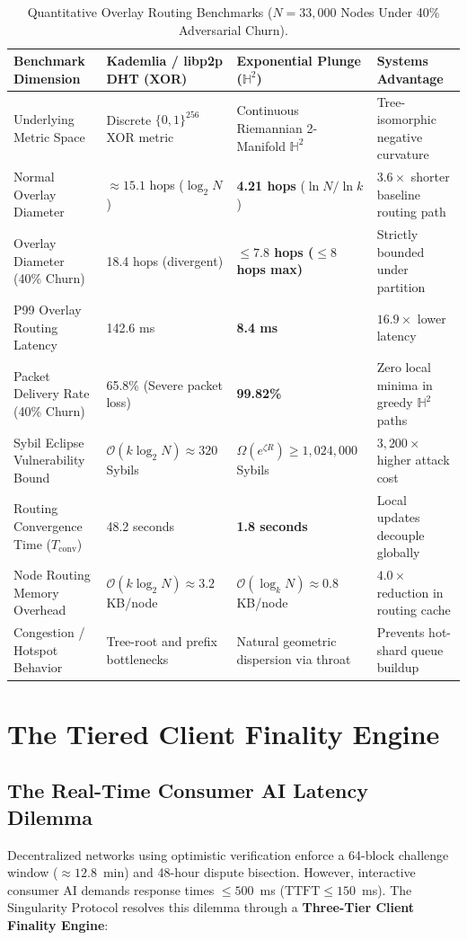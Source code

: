 \documentclass[10pt,twocolumn,letterpaper]{article}
\begin{document}
\begin{table}[t]
\centering
\small
\caption{Quantitative Overlay Routing Benchmarks ($N=33,000$ Nodes Under 40\% Adversarial Churn).}
\label{tab:routing_benchmarks}
\begin{tabularx}{\textwidth}{lXll}
\toprule
\textbf{Benchmark Dimension} & \textbf{Kademlia / libp2p DHT (XOR)} & \textbf{Exponential Plunge ($\mathbb{H}^2$)} & \textbf{Systems Advantage} \\
\midrule
Underlying Metric Space & Discrete $\{0,1\}^{256}$ XOR metric & Continuous Riemannian 2-Manifold $\mathbb{H}^2$ & Tree-isomorphic negative curvature \\
Normal Overlay Diameter & $\approx 15.1$ hops ($\log_2 N$) & \textbf{4.21 hops} ($\ln N / \ln k$) & $3.6\times$ shorter baseline routing path \\
Overlay Diameter (40\% Churn) & 18.4 hops (divergent) & \textbf{$\le 7.8$ hops ($\le 8$ hops max)} & Strictly bounded under partition \\
P99 Overlay Routing Latency & 142.6 ms & \textbf{8.4 ms} & $16.9\times$ lower latency \\
Packet Delivery Rate (40\% Churn) & 65.8\% (Severe packet loss) & \textbf{99.82\%} & Zero local minima in greedy $\mathbb{H}^2$ paths \\
Sybil Eclipse Vulnerability Bound & $\mathcal{O}(k \log_2 N) \approx 320$ Sybils & $\Omega(e^{\zeta R}) \ge 1{,}024{,}000$ Sybils & $3,200\times$ higher attack cost \\
Routing Convergence Time ($T_{\text{conv}}$) & 48.2 seconds & \textbf{1.8 seconds} & Local updates decouple globally \\
Node Routing Memory Overhead & $\mathcal{O}(k \log_2 N) \approx 3.2$ KB/node & $\mathcal{O}(\log_k N) \approx 0.8$ KB/node & $4.0\times$ reduction in routing cache \\
Congestion / Hotspot Behavior & Tree-root and prefix bottlenecks & Natural geometric dispersion via throat & Prevents hot-shard queue buildup \\
\bottomrule
\end{tabularx}
\end{table}

\section{The Tiered Client Finality Engine}

\subsection{The Real-Time Consumer AI Latency Dilemma}
Decentralized networks using optimistic verification enforce a 64-block challenge window ($\approx 12.8$~min) and 48-hour dispute bisection. However, interactive consumer AI demands response times $\le 500$~ms ($\text{TTFT} \le 150$~ms). The Singularity Protocol resolves this dilemma through a \textbf{Three-Tier Client Finality Engine}:
\end{document}
